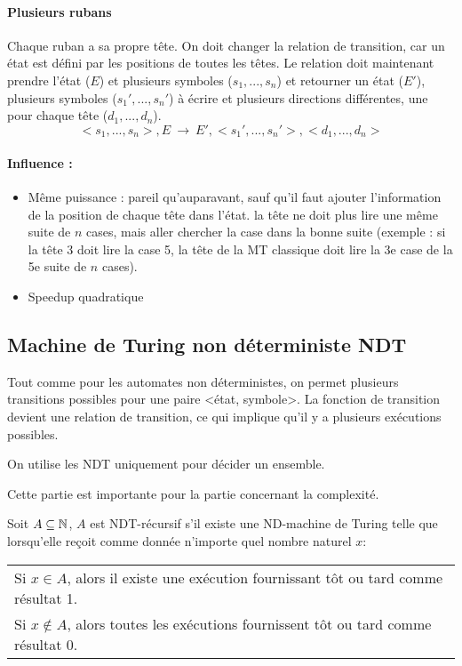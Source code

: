 \paragraph{Plusieurs rubans} Chaque ruban a sa propre tête.
On doit changer la relation de transition, car un état est défini par les positions
de toutes les têtes. Le relation doit maintenant prendre l'état ($E$) et plusieurs
symboles ($s_1,...,s_n$) et retourner un état ($E'$), plusieurs symboles
($s_1',...,s_n'$) à écrire et plusieurs directions différentes, une pour chaque tête
($d_1,...,d_n$).
$$ <s_1,...,s_n>, E \ \rightarrow \ E', <s_1',...,s_n'>, <d_1,...,d_n> $$
\paragraph{Influence :}
\begin{itemize}
	\item Même puissance : pareil qu'auparavant, sauf qu'il faut ajouter l'information de la position de chaque tête dans l'état. la tête ne doit plus lire une même suite de $n$ cases, mais aller chercher la case dans la bonne suite (exemple : si la tête 3 doit lire la case 5, la tête de la MT classique doit lire la 3e case de la 5e suite de $n$ cases).
	\item Speedup quadratique
\end{itemize}

\subsection{Machine de Turing non déterministe NDT}
Tout comme pour les automates non déterministes, on permet plusieurs
transitions possibles pour une paire <état, symbole>. La fonction de transition
devient une relation de transition, ce qui implique qu'il y a plusieurs
 exécutions possibles.

\begin{myrem}
	On utilise les NDT uniquement pour décider un ensemble.
\end{myrem}

\begin{myrem}
	Cette partie est importante pour la partie concernant la complexité.
\end{myrem}

\begin{mydef} Soit $A\subseteq \mathbb{N}$, $A$ est NDT-récursif s'il
	existe une ND-machine de Turing telle que lorsqu'elle reçoit comme
	donnée n'importe quel nombre naturel $x$:\\
	\begin{tabular}{l}
		Si $x\in A$, alors il existe une exécution fournissant tôt ou
		tard comme résultat 1.\\
		Si $x\notin A$, alors toutes les exécutions fournissent tôt ou
		tard comme résultat 0.\\
	\end{tabular}
\end{mydef}

